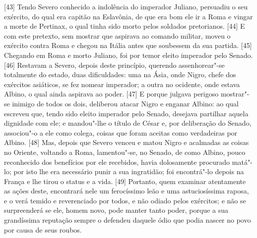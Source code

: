 {[}43{]} Tendo Severo conhecido a indolência do imperador Juliano,
persuadiu o seu exército, do qual era capitão na Eslavônia, de que era bom ele ir a Roma e vingar a morte de Pertinax, o
qual tinha sido morto pelos soldados pretorianos. {[}44{]} E com este
pretexto, sem mostrar que aspirava ao comando militar, moveu o exército
contra Roma e chegou na Itália antes que soubessem da sua partida.
{[}45{]} Chegando em Roma e morto Juliano, foi por temor eleito
imperador pelo Senado. {[}46{]} Restavam a Severo, depois deste
princípio, querendo assenhorear"-se totalmente do estado, duas
dificuldades: uma na Ásia, onde Nigro, chefe dos
exércitos asiáticos, se fez nomear imperador; a outra no ocidente, onde
estava Albino, o qual ainda aspirava ao poder.
{[}47{]} E porque julgava perigoso mostrar"-se inimigo de todos os dois,
deliberou atacar Nigro e enganar Albino: ao qual escreveu que, tendo
sido eleito imperador pelo Senado, desejava partilhar aquela dignidade
com ele; e mandou"-lhe o título de César e, por deliberação do Senado,
associou"-o a ele como colega, coisas que foram aceitas como verdadeiras
por Albino. {[}48{]} Mas, depois que Severo venceu e matou Nigro e
acalmadas as coisas no Oriente, voltando a Roma, lamentou"-se, no Senado,
de como Albino, pouco reconhecido dos benefícios por ele recebidos,
havia dolosamente procurado matá"-lo; por isto lhe era necessário punir a
sua ingratidão; foi encontrá"-lo depois na França e lhe tirou o status e
a vida. {[}49{]} Portanto, quem examinar atentamente as ações deste,
encontrará nele um ferocíssimo leão e uma astuciosíssima raposa, e o
verá temido e reverenciado por todos, e não odiado pelos exércitos; e
não se surpreenderá se ele, homem novo, pode manter tanto poder, porque
a sua grandíssima reputação sempre o defendeu daquele ódio que podia
nascer no povo por causa de seus roubos.

